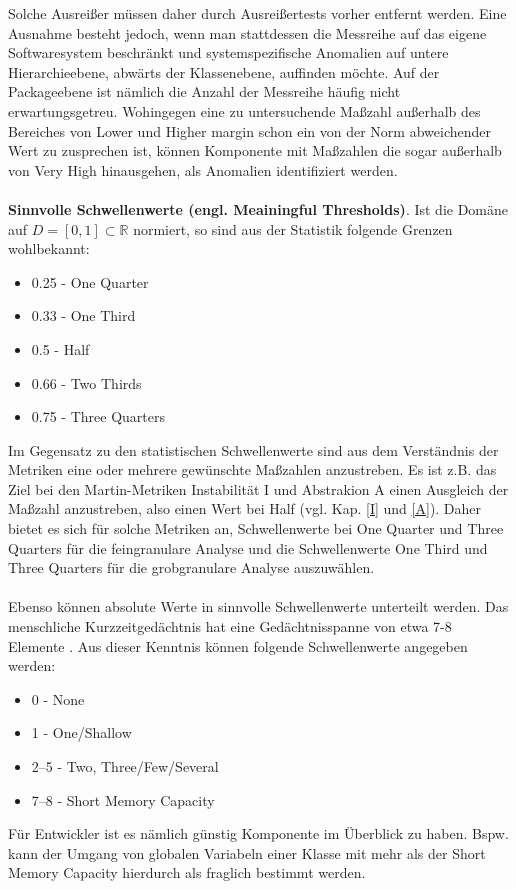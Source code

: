 \documentclass[12pt]{article}
\begin{document}
Solche Ausreißer müssen daher durch Ausreißertests vorher
entfernt werden.  Eine Ausnahme besteht jedoch, wenn man
stattdessen die Messreihe auf das eigene Softwaresystem
beschränkt und systemspezifische Anomalien auf untere
Hierarchieebene, abwärts der Klassenebene, auffinden möchte.  Auf
der Packageebene ist nämlich die Anzahl der Messreihe häufig
nicht erwartungsgetreu.
Wohingegen eine zu untersuchende Maßzahl
außerhalb des Bereiches von Lower und Higher margin schon ein von
der Norm abweichender Wert zu zusprechen ist, können Komponente
mit Maßzahlen die sogar außerhalb von Very High hinausgehen, als
Anomalien identifiziert werden. 
\\
\\
\textbf{Sinnvolle Schwellenwerte (engl. Meainingful Thresholds)}.
Ist die Domäne auf $D = [0,1] \subset \mathbb{R}$ normiert, so
sind aus der Statistik folgende Grenzen wohlbekannt:
\begin{itemize}
        \item 0.25 - One Quarter
        \item 0.33 - One Third 
        \item 0.5 - Half
        \item 0.66 - Two Thirds 
        \item 0.75 - Three Quarters 
\end{itemize}
Im Gegensatz zu den statistischen Schwellenwerte sind aus dem
Verständnis der Metriken eine oder mehrere gewünschte Maßzahlen
anzustreben.  Es ist z.B. das Ziel bei den Martin-Metriken
Instabilität I und Abstrakion A einen Ausgleich der Maßzahl
anzustreben, also einen Wert bei Half (vgl.  Kap. \ref{I} und
\ref{A}).  Daher bietet es sich für solche Metriken an,
Schwellenwerte bei One Quarter und Three Quarters für die
feingranulare Analyse und die Schwellenwerte One Third und Three
Quarters für die grobgranulare Analyse auszuwählen.
\\
\\
Ebenso können absolute Werte in sinnvolle Schwellenwerte
unterteilt werden. Das menschliche Kurzzeitgedächtnis hat eine
Gedächtnisspanne von etwa 7-8 Elemente \cite{Mil56}. Aus dieser
Kenntnis können folgende Schwellenwerte angegeben werden:
\begin{itemize}
        \item 0 - None
        \item 1 - One/Shallow
        \item 2--5 - Two, Three/Few/Several
        \item 7--8 - Short Memory Capacity
\end{itemize}
Für Entwickler ist es nämlich günstig Komponente im Überblick zu
haben. Bspw. kann der Umgang von globalen Variabeln einer Klasse
mit mehr als der Short Memory Capacity hierdurch als fraglich
bestimmt werden.
\end{document}
